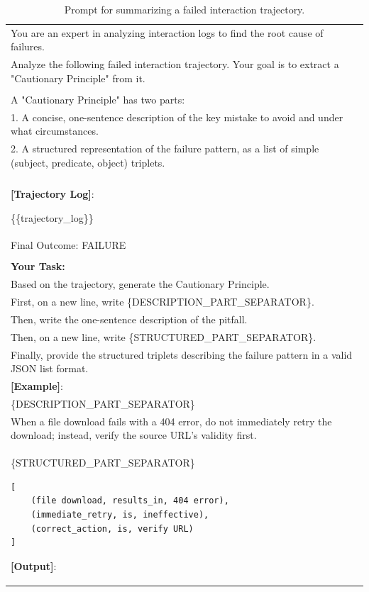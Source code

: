 \begin{table}[ht]
  \centering
  \small
  \label{tab:fail_distill_prompt}
  \caption{Prompt for summarizing a failed interaction trajectory.}
  \begin{tabular}{p{}}
    \toprule
You are an expert in analyzing interaction logs to find the root cause of failures.\\

Analyze the following failed interaction trajectory. Your goal is to extract a "Cautionary Principle" from it.\\ \\

A "Cautionary Principle" has two parts:\\
1. A concise, one-sentence description of the key mistake to avoid and under what circumstances.\\
2. A structured representation of the failure pattern, as a list of simple (subject, predicate, object) triplets.\\ \\

\textbf{[Trajectory Log]}: 

\{\{trajectory\_log\}\} \\

Final Outcome: FAILURE\\ \\

\textbf{Your Task:}\\
Based on the trajectory, generate the Cautionary Principle.\\
First, on a new line, write \{DESCRIPTION\_PART\_SEPARATOR\}.\\
Then, write the one-sentence description of the pitfall.\\
Then, on a new line, write \{STRUCTURED\_PART\_SEPARATOR\}.\\
Finally, provide the structured triplets describing the failure pattern in a valid JSON list format.\\[0.5em]

\textbf{[Example]}:\\
\{DESCRIPTION\_PART\_SEPARATOR\}\\
When a file download fails with a 404 error, do not immediately retry the download; instead, verify the source URL's validity first.\\
\{STRUCTURED\_PART\_SEPARATOR\}
\begin{verbatim}
[
    (file download, results_in, 404 error),
    (immediate_retry, is, ineffective),
    (correct_action, is, verify URL)
]
\end{verbatim}
\textbf{[Output]}:\\
    \bottomrule
  \end{tabular}
\end{table}



